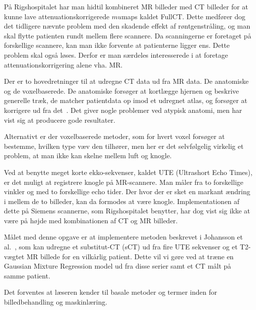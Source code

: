 På Rigshospitalet har man hidtil kombineret MR billeder med CT billeder
for at kunne lave attenuationskorrigerede $mu$maps kaldet FullCT.
Dette medfører dog det tidligere nævnte problem med den skadende
effekt af røntgenstråling, og man skal flytte patienten rundt mellem
flere scannere. Da scanningerne er foretaget på forskellige scannere,
kan man ikke forvente at patienterne ligger ens. Dette problem skal
også løses. Derfor er man særdeles interesserede i at foretage
attenuationskorrigering alene vha. MR.

Der er to hovedretninger til at udregne CT data ud fra MR data. De
anatomiske og de voxelbaserede. De anatomiske forsøger at kortlægge
hjernen og beskrive generelle træk, de matcher patientdata op imod
et udregnet atlas, og forsøger at korrigere ud fra det~\cite{atlas1,
atlas2}. Det giver nogle problemer ved atypisk anatomi, men har vist sig
at producere gode resultater.

Alternativt er der voxelbaserede metoder, som for hvert voxel forsøger
at bestemme, hvilken type væv den tilhører, men her er det selvfølgelig
virkelig et problem, at man ikke kan skelne mellem luft og knogle.

Ved at benytte meget korte ekko-sekvenser, kaldet UTE (Ultrashort Echo
Times), er det muligt at registrere knogle på MR-scannere. Man måler fra
to forskellige vinkler og med to forskellige echo tider. Der hvor der er
sket en markant ændring i mellem de to billeder, kan da formodes at være
knogle. Implementationen af dette på Siemens scannerne, som Rigshospitalet
benytter, har dog vist sig ikke at være på højde med kombinationen af
CT og MR billeder.

Målet med denne opgave er at implementere metoden beskrevet i
Johansson et al.~\cite{johansson}, som kan udregne et substitut-CT (sCT)
ud fra fire UTE sekvenser og et T2-vægtet MR billede for en vilkårlig
patient. Dette vil vi gøre ved at træne en Gaussian Mixture Regression
model ud fra disse serier samt et CT målt på samme patient.

Det forventes at læseren kender til basale metoder og termer inden for
billedbehandling og maskinlæring.
